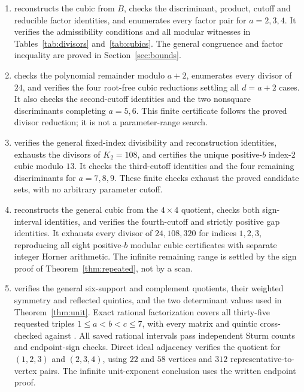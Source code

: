 \begin{enumerate}
\item {} reconstructs
the cubic from $B$, checks the discriminant, product, cutoff and reducible
factor identities, and enumerates every factor pair for $a=2,3,4$.
It verifies the admissibility conditions and all modular witnesses in
Tables~\ref{tab:divisors} and~\ref{tab:cubics}. The general congruence
and factor inequality are proved in Section~\ref{sec:bounds}.
\item {} checks the polynomial
remainder modulo $a+2$, enumerates every divisor of $24$, and verifies
the four root-free cubic reductions settling all $d=a+2$ cases.
It also checks the second-cutoff identities and the two nonsquare
discriminants completing $a=5,6$. This finite certificate follows the
proved divisor reduction; it is not a parameter-range search.
\item {} verifies the general
fixed-index divisibility and reconstruction identities, exhausts the
divisors of $K_2=108$, and certifies the unique positive-$b$ index-$2$
cubic modulo $13$. It checks the third-cutoff identities and the four
remaining discriminants for $a=7,8,9$. These finite checks exhaust the
proved candidate sets, with no arbitrary parameter cutoff.
\item {} reconstructs
the general cubic from the $4\times4$ quotient, checks both sign-interval
identities, and verifies the fourth-cutoff and strictly positive gap
identities. It exhausts every divisor of $24,108,320$ for indices
$1,2,3$, reproducing all eight positive-$b$ modular cubic certificates
with separate integer Horner arithmetic. The infinite remaining range is
settled by the sign proof of Theorem~\ref{thm:repeated}, not by a scan.
\item {} verifies the general
six-support and complement quotients, their weighted symmetry and reflected
quintics, and the two determinant values used in Theorem~\ref{thm:unit}.
Exact rational factorization covers all thirty-five requested triples
$1\leq a<b<c\leq7$, with every matrix and quintic cross-checked against
. All saved rational intervals
pass independent Sturm counts and endpoint-sign checks.
Direct ideal adjacency verifies the quotient for
$(1,2,3)$ and $(2,3,4)$, using $22$ and $58$ vertices and $312$
representative-to-vertex pairs. The infinite unit-exponent conclusion
uses the written endpoint proof.

\end{enumerate}
